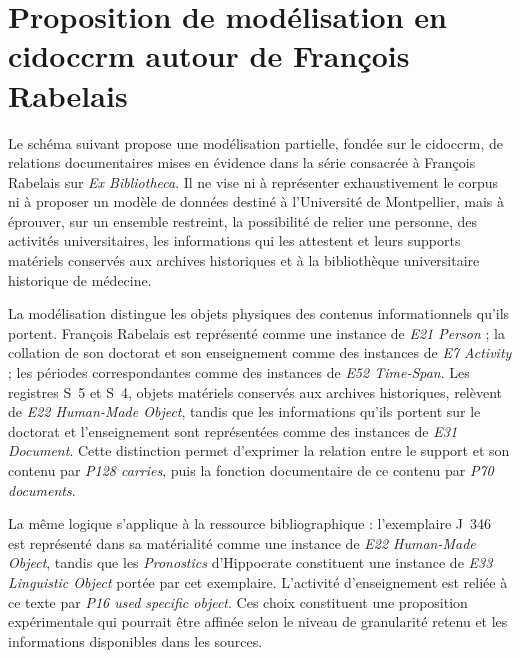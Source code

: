 \chapter{Proposition de modélisation en \gls{cidoccrm} autour de François Rabelais}
\label{annexe:rabelais-cidoccrm}

Le schéma suivant propose une modélisation partielle, fondée sur le \gls{cidoccrm}, de relations documentaires mises en évidence dans la série consacrée à François Rabelais sur \emph{Ex Bibliotheca}. Il ne vise ni à représenter exhaustivement le corpus ni à proposer un modèle de données destiné à l'Université de Montpellier, mais à éprouver, sur un ensemble restreint, la possibilité de relier une personne, des activités universitaires, les informations qui les attestent et leurs supports matériels conservés aux archives historiques et à la bibliothèque universitaire historique de médecine.

La modélisation distingue les objets physiques des contenus informationnels qu'ils portent. François Rabelais est représenté comme une instance de \emph{E21 Person} ; la collation de son doctorat et son enseignement comme des instances de \emph{E7 Activity} ; les périodes correspondantes comme des instances de \emph{E52 Time-Span}. Les registres S~5 et S~4, objets matériels conservés aux archives historiques, relèvent de \emph{E22 Human-Made Object}, tandis que les informations qu'ils portent sur le doctorat et l'enseignement sont représentées comme des instances de \emph{E31 Document}. Cette distinction permet d'exprimer la relation entre le support et son contenu par \emph{P128 carries}, puis la fonction documentaire de ce contenu par \emph{P70 documents}.

La même logique s'applique à la ressource bibliographique : l'exemplaire J~346 est représenté dans sa matérialité comme une instance de \emph{E22 Human-Made Object}, tandis que les \emph{Pronostics} d'Hippocrate constituent une instance de \emph{E33 Linguistic Object} portée par cet exemplaire. L'activité d'enseignement est reliée à ce texte par \emph{P16 used specific object}. Ces choix constituent une proposition expérimentale qui pourrait être affinée selon le niveau de granularité retenu et les informations disponibles dans les sources.


